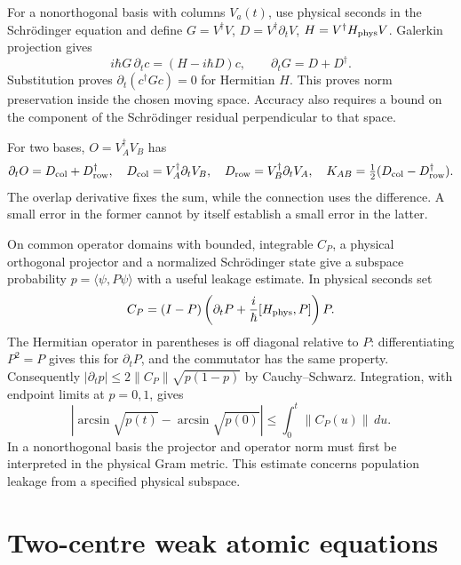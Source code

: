 For a nonorthogonal basis with columns $V_a(t)$, use physical seconds in the Schr\"odinger equation and define
$G=V^\dagger V$, $D=V^\dagger\partial_tV$, $H=V^\dagger H_{\rm phys}V$. Galerkin projection gives
\begin{equation}
 i\hbar G\,\partial_tc=(H-i\hbar D)c,\qquad
 \partial_tG=D+D^\dagger .
 \label{v:moving_schrodinger}
\end{equation}
Substitution proves $\partial_t(c^\dagger Gc)=0$ for Hermitian $H$. This proves norm preservation inside the chosen moving space. Accuracy also requires a bound on the component of the Schr\"odinger residual perpendicular to that space.

For two bases, $O=V_A^\dagger V_B$ has
\begin{equation}
 \partial_tO=D_{\rm col}+D_{\rm row}^\dagger,\quad
 D_{\rm col}=V_A^\dagger\partial_tV_B,\quad
 D_{\rm row}=V_B^\dagger\partial_tV_A,\quad
 K_{AB}=\tfrac12(D_{\rm col}-D_{\rm row}^\dagger).
 \label{v:cross_connection}
\end{equation}
The overlap derivative fixes the sum, while the connection uses the difference. A small error in the former cannot by itself establish a small error in the latter.

On common operator domains with bounded, integrable $C_P$, a physical orthogonal projector and a normalized Schr\"odinger state give a subspace probability $p=\langle\psi,P\psi\rangle$ with a useful leakage estimate. In physical seconds set
\begin{equation}
 C_P=(I-P)\left(\partial_tP+\frac{i}{\hbar}[H_{\rm phys},P]\right)P .
 \label{v:quantum_leakage}
\end{equation}
The Hermitian operator in parentheses is off diagonal relative to $P$: differentiating $P^2=P$ gives this for $\partial_tP$, and the commutator has the same property. Consequently
$|\partial_tp|\le2\|C_P\|\sqrt{p(1-p)}$ by Cauchy--Schwarz. Integration, with endpoint limits at $p=0,1$, gives
\begin{equation}
 |\arcsin\sqrt{p(t)}-\arcsin\sqrt{p(0)}|
 \le\int_0^t\|C_P(u)\|\,du .
 \label{v:subspace_probability}
\end{equation}
In a nonorthogonal basis the projector and operator norm must first be interpreted in the physical Gram metric. This estimate concerns population leakage from a specified physical subspace.

\section{Two-centre weak atomic equations}
\label{v:two_centre}

